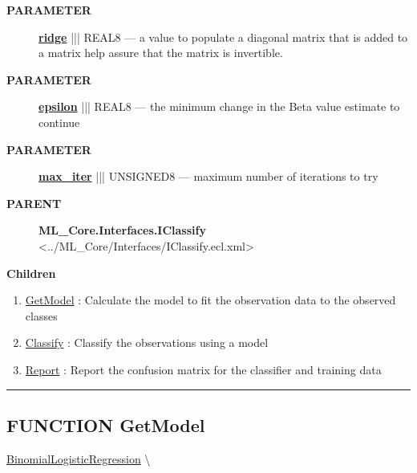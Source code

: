 \par
\begin{description}
\item [\colorbox{tagtype}{\color{white} \textbf{\textsf{PARAMETER}}}] \textbf{\underline{ridge}} ||| REAL8 --- a value to populate a diagonal matrix that is added to a matrix help assure that the matrix is invertible.
\item [\colorbox{tagtype}{\color{white} \textbf{\textsf{PARAMETER}}}] \textbf{\underline{epsilon}} ||| REAL8 --- the minimum change in the Beta value estimate to continue
\item [\colorbox{tagtype}{\color{white} \textbf{\textsf{PARAMETER}}}] \textbf{\underline{max\_iter}} ||| UNSIGNED8 --- maximum number of iterations to try
\end{description}









\par
\begin{description}
\item [\colorbox{tagtype}{\color{white} \textbf{\textsf{PARENT}}}] \textbf{ML\_Core.Interfaces.IClassify} <../ML\_Core/Interfaces/IClassify.ecl.xml>
\end{description}


\textbf{Children}
\begin{enumerate}
\item \hyperlink{ecldoc:logisticregression.binomiallogisticregression.getmodel}{GetModel}
: Calculate the model to fit the observation data to the observed classes
\item \hyperlink{ecldoc:logisticregression.binomiallogisticregression.classify}{Classify}
: Classify the observations using a model
\item \hyperlink{ecldoc:logisticregression.binomiallogisticregression.report}{Report}
: Report the confusion matrix for the classifier and training data
\end{enumerate}

\rule{\linewidth}{0.5pt}

\subsection*{\textsf{\colorbox{headtoc}{\color{white} FUNCTION}
GetModel}}

\hypertarget{ecldoc:logisticregression.binomiallogisticregression.getmodel}{}
\hspace{0pt} \hyperlink{ecldoc:logisticregression.binomiallogisticregression}{BinomialLogisticRegression} \textbackslash 

